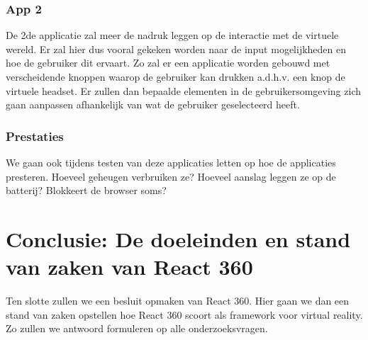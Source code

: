 \subsubsection{App 2}
De 2de applicatie zal meer de nadruk leggen op de interactie met de virtuele wereld. Er zal hier dus vooral gekeken worden naar de input mogelijkheden en hoe de gebruiker dit ervaart. Zo zal er een applicatie worden gebouwd met verscheidende knoppen waarop de gebruiker kan drukken a.d.h.v. een knop de virtuele headset. Er zullen dan bepaalde elementen in de gebruikersomgeving zich gaan aanpassen afhankelijk van wat de gebruiker geselecteerd heeft.

\subsubsection{Prestaties}
We gaan ook tijdens testen van deze applicaties letten op hoe de applicaties presteren. Hoeveel geheugen verbruiken ze? Hoeveel aanslag leggen ze op de batterij? Blokkeert de browser soms?

\section{Conclusie: De doeleinden en stand van zaken van React 360}
\label{sec:doeleinden-reactvr}
Ten slotte zullen we een besluit opmaken van React 360. Hier gaan we dan een stand van zaken opstellen hoe React 360 scoort als framework voor virtual reality. Zo zullen we antwoord formuleren op alle onderzoeksvragen.



